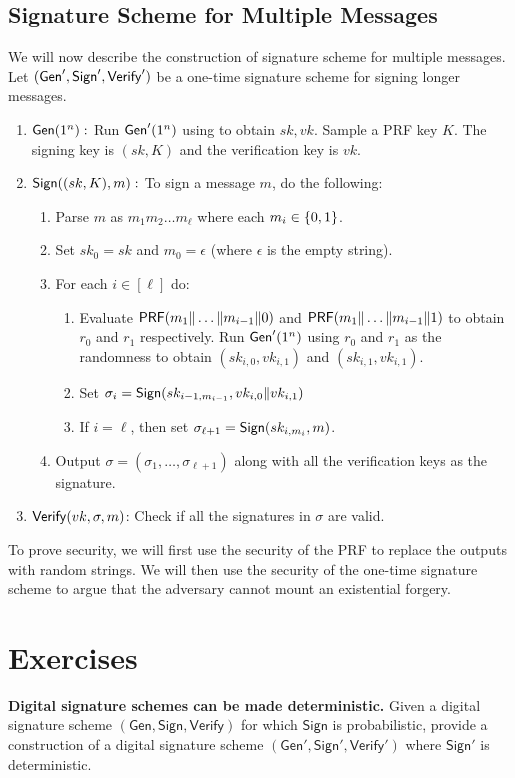 \documentclass[12pt]{tufte-book}
\begin{document}
\subsection{Signature Scheme for Multiple Messages}
We will now describe the construction of signature scheme for multiple messages. Let $(\mathsf{Gen}',\mathsf{Sign}',\mathsf{Verify}')$ be a one-time signature scheme for signing longer messages. 
\begin{enumerate}
    \item $\mathsf{Gen}(1^n):$ Run $\mathsf{Gen}'(1^n)$ using to obtain $sk,vk$. Sample a PRF key $K$. The signing key is $(sk,K)$ and the verification key is $vk$.
    \item $\mathsf{Sign}((sk,K),m):$ To sign a message $m$, do the following:
    \begin{enumerate}
        \item Parse $m$ as $m_1m_2\ldots m_{\ell}$ where each $m_i \in \{0,1\}$.
        \item Set $sk_0 = sk$ and $m_0 = \epsilon$ (where $\epsilon$ is the empty string).
        \item For each $i \in [\ell]$ do:
        \begin{enumerate}
            \item Evaluate $\mathsf{PRF}(m_1\|\ldots\|m_{i-1}\|0)$ and $\mathsf{PRF}(m_1\|\ldots\|m_{i-1}\|1)$ to obtain $r_0$ and $r_1$ respectively. Run $\mathsf{Gen}'(1^n)$ using $r_0$ and $r_1$ as the randomness to obtain $(sk_{i,0},vk_{i,1})$ and $(sk_{i,1},vk_{i,1})$.
            \item Set $\sigma_i = \mathsf{Sign}(sk_{i-1,m_{i-1}},vk_{i,0}\|vk_{i,1})$
            \item If $i = \ell$, then set $\sigma_{\ell+1} = \mathsf{Sign}(sk_{i,m_i},m)$.

        \end{enumerate}
        \item Output $\sigma = (\sigma_1,\ldots,\sigma_{\ell+1})$ along with all the verification keys as the signature.
    \end{enumerate}
    \item $\mathsf{Verify}(vk,\sigma,m)$: Check if all the signatures in $\sigma$ are valid.
\end{enumerate}

To prove security, we will first use the security of the PRF to replace the outputs with random strings. We will then use the security of the one-time signature scheme to argue that the adversary cannot mount an existential forgery.

\section*{Exercises}
\begin{exercise}
\textbf{Digital signature schemes can be made deterministic.} Given a digital signature scheme $(\mathsf{Gen}, \mathsf{Sign}, \mathsf{Verify})$ for which $\mathsf{Sign}$ is probabilistic, provide a construction of a digital signature scheme $(\mathsf{Gen}', \mathsf{Sign}', \mathsf{Verify}')$ where $\mathsf{Sign}'$ is deterministic.
\end{exercise}





\backmatter



\end{document}
